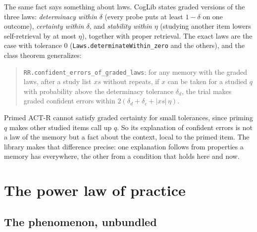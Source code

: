 \documentclass[11pt]{article}
\newcommand{\lean}[1]{\texttt{#1}}
\begin{document}
The same fact says something about laws. CogLib states graded versions of the three laws: \emph{determinacy within $\delta$} (every probe puts at least $1-\delta$ on one outcome), \emph{certainty within $\delta$}, and \emph{stability within $\eta$} (studying another item lowers self-retrieval by at most $\eta$), together with proper retrieval. The exact laws are the case with tolerance 0 (\lean{Laws.determinateWithin\_zero} and the others), and the class theorem generalizes:

\begin{quote}
\lean{RR.confident\_errors\_of\_graded\_laws}: for any memory with the graded laws, after a study list $xs$ without repeats, if $x$ can be taken for a studied $q$ with probability above the determinacy tolerance $\delta_d$, the trial makes graded confident errors within $2(\delta_d + \delta_c + |xs|\,\eta)$.
\end{quote}

Primed ACT-R cannot satisfy graded certainty for small tolerances, since priming $q$ makes other studied items call up $q$. So its explanation of confident errors is not a law of the memory but a fact about the context, local to the primed item. The library makes that difference precise: one explanation follows from properties a memory has everywhere, the other from a condition that holds here and now.

\section{The power law of practice}
\label{sec:power}

\subsection{The phenomenon, unbundled}
\end{document}
